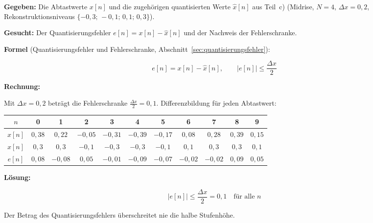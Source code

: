 \begin{beispiel}

\textbf{Gegeben:} Die Abtastwerte $x[n]$ und die zugehörigen quantisierten Werte
$\hat{x}[n]$ aus Teil~c) (Midrise, $N = 4$, $\Delta x = 0{,}2$,
Rekonstruktionsniveaus $\{-0{,}3;\,-0{,}1;\,0{,}1;\,0{,}3\}$).

\textbf{Gesucht:} Der Quantisierungsfehler $e[n] = x[n] - \hat{x}[n]$ und der
Nachweis der Fehlerschranke.

\textbf{Formel} (Quantisierungsfehler und Fehlerschranke,
Abschnitt~\ref{sec:quantisierungsfehler}):

$$
e[n] = x[n] - \hat{x}[n], \qquad |e[n]| \leq \frac{\Delta x}{2}
$$

\textbf{Rechnung:}

Mit $\Delta x = 0{,}2$ beträgt die Fehlerschranke $\tfrac{\Delta x}{2} = 0{,}1$.
Differenzbildung für jeden Abtastwert:

\begin{center}
\begin{tabular}{c|cccccccccc}
\toprule
$n$ & 0 & 1 & 2 & 3 & 4 & 5 & 6 & 7 & 8 & 9 \\
\midrule
$x[n]$        & $0{,}38$ & $0{,}22$ & $-0{,}05$ & $-0{,}31$ & $-0{,}39$ & $-0{,}17$ & $0{,}08$ & $0{,}28$ & $0{,}39$ & $0{,}15$ \\
$\hat{x}[n]$  & $0{,}3$  & $0{,}3$  & $-0{,}1$  & $-0{,}3$  & $-0{,}3$  & $-0{,}1$  & $0{,}1$  & $0{,}3$  & $0{,}3$  & $0{,}1$ \\
$e[n]$        & $0{,}08$ & $-0{,}08$& $0{,}05$  & $-0{,}01$ & $-0{,}09$ & $-0{,}07$ & $-0{,}02$& $-0{,}02$& $0{,}09$ & $0{,}05$ \\
\bottomrule
\end{tabular}
\end{center}

\textbf{Lösung:}

$$
\boxed{\;|e[n]| \leq \frac{\Delta x}{2} = 0{,}1 \quad \text{für alle } n\;}
$$

Der Betrag des Quantisierungsfehlers überschreitet nie die halbe Stufenhöhe.


\end{beispiel}
